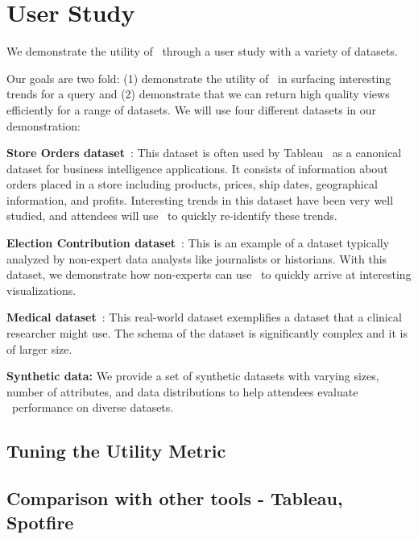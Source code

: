 
\section{User Study}

We demonstrate the utility of \SeeDB\ through  a user study
with a variety of datasets. 

Our goals are two fold: (1) demonstrate
the utility of \SeeDB\ in surfacing interesting trends for a query
and (2) demonstrate that we can return high quality views efficiently for
a range of datasets. We will use four different datasets in our demonstration:

\squishlist
  \item {\bf Store Orders dataset}~\cite{superstore}: This dataset is
    often used by Tableau~\cite{tableau} as a canonical dataset for
    business intelligence applications. It consists of information
    about orders placed in a store including products, prices, ship
    dates, geographical information, and profits. Interesting trends in
    this dataset have been very well studied, and attendees will use
    \SeeDB\ to quickly re-identify these trends. 
  \item {\bf Election Contribution dataset}~\cite{election_data}: This
  is an example of a dataset typically analyzed by
    non-expert data analysts like journalists or historians. With this
    dataset, we demonstrate how non-experts can use \SeeDB\ to quickly
    arrive at interesting visualizations.
  \item {\bf Medical dataset}~\cite{mimic}: This real-world dataset exemplifies
  a dataset that a clinical researcher might use. The schema of the dataset is
  significantly complex and it is of larger size.  
    \item {\bf Synthetic data:} We provide a set of synthetic datasets with
    varying sizes, number of attributes, and data distributions to help
    attendees evaluate \SeeDB\ performance on diverse datasets.
\squishend


\subsection{Tuning the Utility Metric}
\subsection{Comparison with other tools - Tableau, Spotfire}

